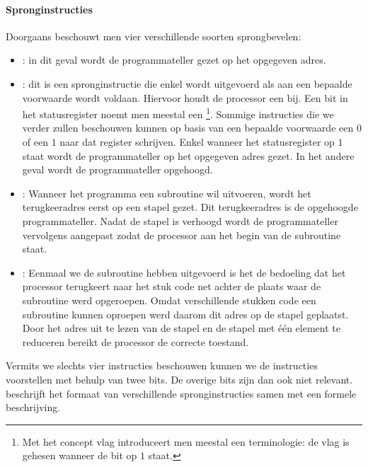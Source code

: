 \paragraph{Spronginstructies}
Doorgaans beschouwt men vier verschillende soorten sprongbevelen:
\begin{itemize}
 \item {}: in dit geval wordt de programmateller gezet op het opgegeven adres.
 \item {}: dit is een spronginstructie die enkel wordt uitgevoerd als aan een bepaalde voorwaarde wordt voldaan. Hiervoor houdt de processor een  bij. Een bit in het statusregister noemt men meestal een \footnote{Met het concept vlag introduceert men meestal een terminologie: de vlag is gehesen wanneer de bit op $1$ staat.}. Sommige instructies die we verder zullen beschouwen kunnen op basis van een bepaalde voorwaarde een $0$ of een $1$ naar dat register schrijven. Enkel wanneer het statusregister op $1$ staat wordt de programmateller op het opgegeven adres gezet. In het andere geval wordt de programmateller opgehoogd.
 \item {}: Wanneer het programma een subroutine wil uitvoeren, wordt het terugkeeradres eerst op een stapel gezet. Dit terugkeeradres is de opgehoogde programmateller. Nadat de stapel is verhoogd wordt de programmateller vervolgens aangepast zodat de processor aan het begin van de subroutine staat.
 \item {}: Eenmaal we de subroutine hebben uitgevoerd is het de bedoeling dat het processor terugkeert naar het stuk code net achter de plaats waar de subroutine werd opgeroepen. Omdat verschillende stukken code een subroutine kunnen oproepen werd daarom dit adres op de stapel geplaatst. Door het adres uit te lezen van de stapel en de stapel met \'e\'en element te reduceren bereikt de processor de correcte toestand.
\end{itemize}
Vermits we slechts vier instructies beschouwen kunnen we de instructies voorstellen met behulp van twee bits. De overige bits zijn dan ook niet relevant.  beschrijft het formaat van verschillende spronginstructies samen met een formele beschrijving.
